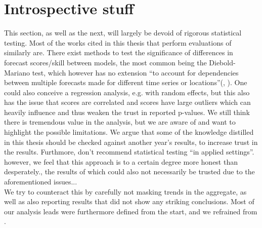 \section{Introspective stuff}
This section, as well as the next, will largely be devoid of rigorous statistical testing. Most of the works cited in this thesis that perform evaluations of similarly are. There exist methods to test the significance of differences in forecast scores/skill between models, the most common being the Diebold-Mariano test, which however has no extension ``to account for dependencies between multiple forecasts made for different time series or locations''(\cite{bracher_evaluating_2021}, \cite{diebold_comparing_1995}). One could also conceive a regression analysis, e.g. with random effects, but this also has the issue that scores are correlated and scores have large outliers which can heavily influence and thus weaken the trust in reported p-values. We still think there is tremendous value in the analysis, but we are aware of and want to highlight the possible limitations. We argue that some of the knowledge distilled in this thesis should be checked against another year's results, to increase trust in the results. Furthmore, \cite{bosse_epiforecastsscoringutils_2022} don't recommend statistical testing ``in applied settings''.\\ 
however, we feel that this approach is to a certain degree more honest than desperately., the results of which could also not necessarily be trusted due to the aforementioned issues...\\
We try to counteract this by carefully not masking trends in the aggregate, as well as also reporting results that did not show any striking conclusions. Most of our analysis leads were furthermore defined from the start, and we refrained from .\\
